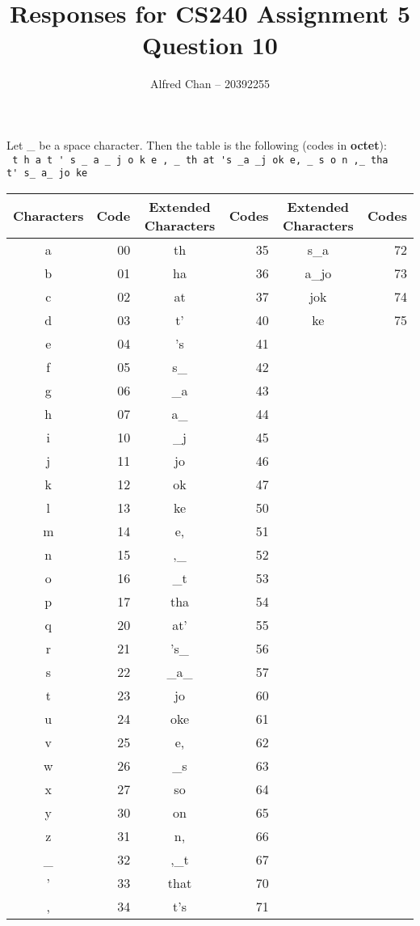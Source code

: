 \documentclass[12pt]{article}
\title{Responses for CS240 Assignment 5 Question 10}
\author{Alfred Chan -- 20392255}
\begin{document}
\maketitle
Let \_ be a space character. Then the table is the following (codes in {\bf octet}):\\
\verb+ t h a t ' s _ a _ j o k e , _ th at 's _a _j ok e, _ s o n ,_ tha+\\
\verb+t' s_ a_ jo ke+ \\
\begin{tabular}{|c|r|c|r|c|r|}
\hline
Characters & Code & Extended Characters & Codes & Extended Characters & Codes\\\hline
a & 00 & th & 35 & s\_a & 72\\\hline
b & 01 & ha & 36 & a\_jo & 73\\\hline
c & 02 & at & 37 & jok & 74\\\hline
d & 03 & t' & 40 & ke & 75\\\hline
e & 04 & 's & 41\\\hline
f & 05 & s\_ & 42\\\hline
g & 06 & \_a & 43\\\hline
h & 07 & a\_ & 44\\\hline
i & 10 & \_j & 45\\\hline
j & 11 & jo & 46\\\hline
k & 12 & ok & 47\\\hline
l & 13 & ke & 50\\\hline
m & 14 & e, & 51\\\hline
n & 15 & ,\_ & 52\\\hline
o & 16 & \_t & 53\\\hline
p & 17 & tha & 54\\\hline
q & 20 & at' & 55\\\hline
r & 21 & 's\_ & 56\\\hline
s & 22 & \_a\_ & 57\\\hline
t & 23 & jo & 60\\\hline
u & 24 & oke & 61\\\hline
v & 25 & e, & 62\\\hline
w & 26 & \_s & 63\\\hline
x & 27 & so & 64\\\hline
y & 30 & on & 65\\\hline
z & 31 & n, & 66\\\hline
\_ & 32 & ,\_t & 67\\\hline
' & 33 & that & 70\\\hline
, & 34 & t's & 71\\\hline
\end{tabular}\\
\end{document}
